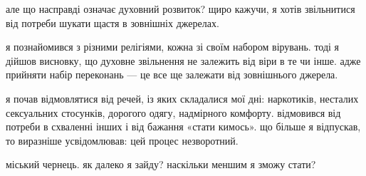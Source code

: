 але що насправді означає духовний розвиток? щиро кажучи, я хотів звільнитися від потреби шукати щастя в зовнішніх джерелах.

я познайомився з різними релігіями, кожна зі своїм набором вірувань. тоді я дійшов висновку, що духовне звільнення не залежить від віри в те чи інше. адже прийняти набір переконань — це все ще залежати від зовнішнього джерела.

я почав відмовлятися від речей, із яких складалися мої дні: наркотиків, несталих сексуальних стосунків, дорогого одягу, надмірного комфорту. відмовився від потреби в схваленні інших і від бажання «стати кимось». що більше я відпускав, то виразніше усвідомлював: цей процес незворотний.

міський чернець. як далеко я зайду? наскільки меншим я зможу стати?
